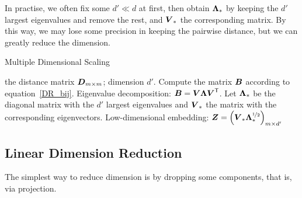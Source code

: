 In practise, we often fix some $d' \ll d$ at first, then obtain $\boldsymbol{\Lambda}_*$ by keeping the $d'$ largest 
eigenvalues and remove the rest, and $\boldsymbol{V}_*$ the corresponding matrix. By this way, we may lose some 
precision in keeping the pairwise distance, but we can greatly reduce the dimension.

\begin{algorithm}
    \caption{Multiple Dimensional Scaling}
    \begin{algorithmic}[1]
        \Require the distance matrix $\boldsymbol{D}_{m \times m}$; dimension $d'$.
        \State Compute the matrix $\boldsymbol{B}$ according to equation~\eqref{DR_bij}.
        \State Eigenvalue decomposition: $\boldsymbol{B} = \boldsymbol{V} \boldsymbol{\Lambda}{\boldsymbol{V}}^\mathsf{T}$.
        \State Let $\boldsymbol{\Lambda}_*$ be the diagonal matrix with the $d'$ largest eigenvalues and $\boldsymbol{V}_*$ the
        matrix with the corresponding eigenvectors.
        \Ensure Low-dimensional embedding: $\boldsymbol{Z} = {\left(\boldsymbol{V}_* \boldsymbol{\Lambda}_*^{\nicefrac{1}{2}}\right)}_{m 
        \times d'}$
    \end{algorithmic}
\end{algorithm}

\subsection{Linear Dimension Reduction}
The simplest way to reduce dimension is by dropping some components, that is, via projection.
